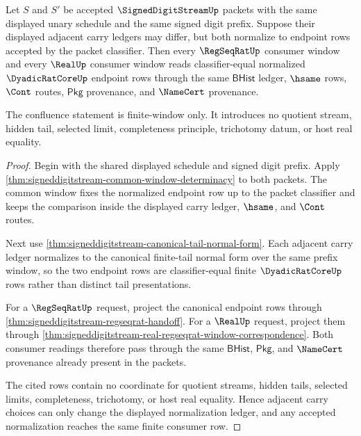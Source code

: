 \begin{theorem}
\label{thm:signeddigitstream-adjacent-carry-confluence}
Let $S$ and $S'$ be accepted $\SignedDigitStreamUp$ packets with the same
displayed unary schedule and the same signed digit prefix. Suppose their
displayed adjacent carry ledgers may differ, but both normalize to endpoint
rows accepted by the packet classifier. Then every $\RegSeqRatUp$ consumer
window and every $\RealUp$ consumer window reads classifier-equal normalized
$\DyadicRatCoreUp$ endpoint rows through the same $\mathsf{BHist}$ ledger,
$\hsame$ rows, $\Cont$ routes, $\mathsf{Pkg}$ provenance, and $\NameCert$
provenance.

The confluence statement is finite-window only. It introduces no quotient
stream, hidden tail, selected limit, completeness principle, trichotomy datum,
or host real equality.
\end{theorem}
\begin{proof}
Begin with the shared displayed schedule and signed digit prefix. Apply
\autoref{thm:signeddigitstream-common-window-determinacy} to both packets. The
common window fixes the normalized endpoint row up to the packet classifier and
keeps the comparison inside the displayed carry ledger, $\hsame$, and $\Cont$
routes.

Next use
\autoref{thm:signeddigitstream-canonical-tail-normal-form}. Each adjacent carry
ledger normalizes to the canonical finite-tail normal form over the same prefix
window, so the two endpoint rows are classifier-equal finite
$\DyadicRatCoreUp$ rows rather than distinct tail presentations.

For a $\RegSeqRatUp$ request, project the canonical endpoint rows through
\autoref{thm:signeddigitstream-regseqrat-handoff}. For a $\RealUp$ request,
project them through
\autoref{thm:signeddigitstream-real-regseqrat-window-correspondence}. Both
consumer readings therefore pass through the same $\mathsf{BHist}$,
$\mathsf{Pkg}$, and $\NameCert$ provenance already present in the packets.

The cited rows contain no coordinate for quotient streams, hidden tails,
selected limits, completeness, trichotomy, or host real equality. Hence adjacent
carry choices can only change the displayed normalization ledger, and any
accepted normalization reaches the same finite consumer row.
\end{proof}


